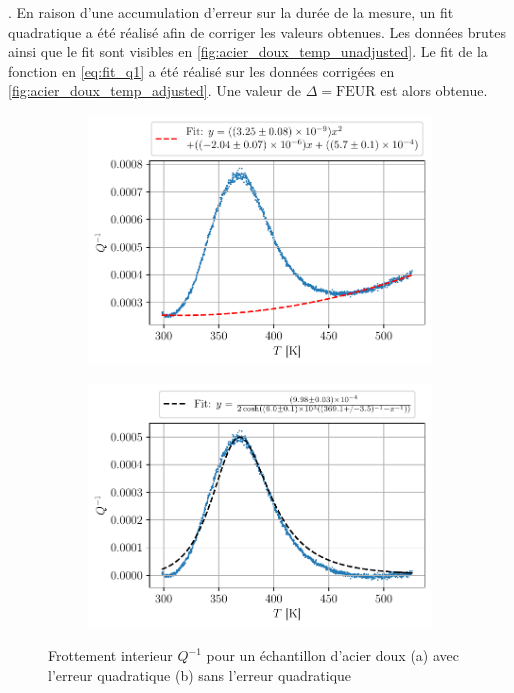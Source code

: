 . En raison d'une accumulation d'erreur sur la durée de la mesure, un fit quadratique a été réalisé afin de corriger les valeurs obtenues. Les données brutes ainsi que le fit sont visibles en \autoref{fig:acier_doux_temp_unadjusted}. Le fit de la fonction en \autoref{eq:fit_q1} a été réalisé sur les données corrigées en \autoref{fig:acier_doux_temp_adjusted}. Une valeur de \(\Delta = \textrm{FEUR}\) est alors obtenue.

\begin{figure}[h]
    \centering
    \begin{subfigure}{0.6\linewidth}
        \centering
        \includegraphics[width=\linewidth]{figures/acier_doux_q_1_temp_unadjusted.pdf}
        \caption{}
        \label{fig:acier_doux_temp_unadjusted}
    \end{subfigure}
    \begin{subfigure}{0.6\linewidth}
        \centering
        \includegraphics[width=\linewidth]{figures/acier_doux_q_1_temp_adjusted.pdf}
        \caption{}
        \label{fig:acier_doux_temp_adjusted}
    \end{subfigure}
    \caption{Frottement interieur \(Q^{-1}\) pour un échantillon d'acier doux (a) avec l'erreur quadratique (b) sans l'erreur quadratique}
\end{figure}


